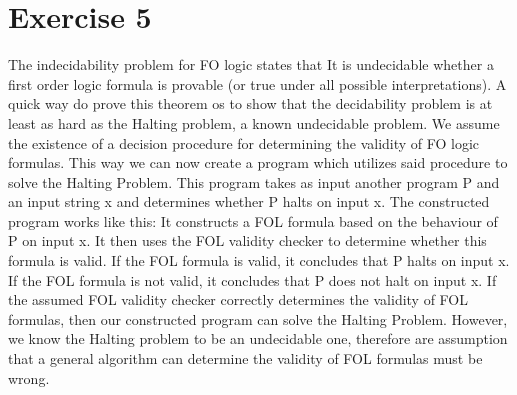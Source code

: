 \documentclass[11pt]{exam}
\begin{document}
\section*{Exercise 5}
The indecidability problem for FO logic states that It is undecidable whether a first order logic formula is provable (or true under all possible interpretations).
A quick way do prove this theorem os to show that the decidability problem is at least as hard as the Halting problem, a known undecidable problem.
We assume the existence of a decision procedure for determining the validity of FO logic formulas. This way we can now create a program which utilizes said procedure to solve the Halting Problem.
This program takes as input another program P and an input string x and determines whether P halts on input x. The constructed program works like this:
It constructs a FOL formula based on the behaviour of P on input x. It then uses the FOL validity checker to determine whether this formula is valid. If the FOL formula is valid, it concludes that P halts on input x. 
If the FOL formula is not valid, it concludes that P does not halt on input x. If the assumed FOL validity checker correctly determines the validity of FOL formulas, then our constructed program can solve the Halting Problem.
However, we know the Halting problem to be an undecidable one, therefore are assumption that a general algorithm can determine the validity of FOL formulas must be wrong.
\end{document}

